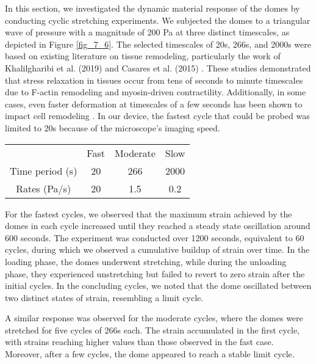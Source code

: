 In this section, we investigated the dynamic material response of the
domes by conducting cyclic stretching experiments. We subjected the
domes to a triangular wave of pressure with a magnitude of 200 Pa at
three distinct timescales, as depicted in Figure \ref{fig_7_6}. The selected timescales of 20s, 266s,
and 2000s were based on existing literature on tissue remodeling,
particularly the work of Khalilgharibi et al. (2019) and Casares et al.
(2015) \cite{khalilgharibi2019, casares2015}. These studies
demonstrated that stress relaxation in tissues occur from tens of
seconds to minute timescales due to F-actin remodeling and myosin-driven
contractility. Additionally, in some cases, even faster deformation at
timescales of a few seconds has been shown to impact cell remodeling \cite{andreu2021a}.
In our device, the fastest cycle that could be
probed was limited to 20s because of the microscope's imaging speed.

\begin{center}
	\begin{table}[h!]
		\label{tab:hysteresis}
		\begin{tabular}{c c c c}
			& Fast & Moderate & Slow \\ 
			Time period (s) & 20   & 266      & 2000 \\ 
			Rates (Pa/s)    & 20   & 1.5      & 0.2  \\ 
		\end{tabular}
	\end{table}
\end{center}

For the fastest cycles, we observed that the maximum strain achieved by
the domes in each cycle increased until they reached a steady state
oscillation around 600 seconds. The experiment was conducted over 1200
seconds, equivalent to 60 cycles, during which we observed a cumulative
buildup of strain over time. In the loading phase, the domes underwent
stretching, while during the unloading phase, they experienced
unstretching but failed to revert to zero strain after the initial
cycles. In the concluding cycles, we noted that the dome oscillated
between two distinct states of strain, resembling a limit cycle.

A similar response was observed for the moderate cycles, where the domes
were stretched for five cycles of 266s each. The strain accumulated in
the first cycle, with strains reaching higher values than those observed
in the fast case. Moreover, after a few cycles, the dome appeared to
reach a stable limit cycle.


